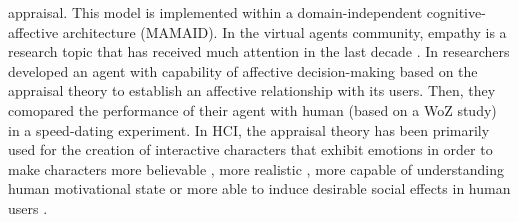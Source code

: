 \documentclass[11pt]{article}
\begin{document}
appraisal. This model is implemented within a domain-independent
cognitive-affective architecture (MAMAID). In the virtual agents community,
empathy is a research topic that has received much attention in the last decade
\cite{brave:emotion-hci} \cite{scott:modeling-empathy-agent}
\cite{paiva:agent-care} \cite{prendinger:empathic-companion}
\cite{bickmore:longterm-relationship}. In \cite{pontier:women-robot-men}
researchers developed an agent with capability of affective decision-making
based on the appraisal theory to establish an affective relationship with its
users. Then, they comopared the performance of their agent with human (based on
a WoZ study) in a speed-dating experiment. In HCI, the appraisal theory has been
primarily used for the creation of interactive characters that exhibit emotions
in order to make characters more believable \cite{neal:believable-agents}, more
realistic \cite{mao:social-causality} \cite{traum:negotiation-teams-training},
more capable of understanding human motivational state
\cite{conati:evaluating-student-affect} or more able to induce desirable social
effects in human users \cite{paiva:learning-feeling}.\\
\end{document}
